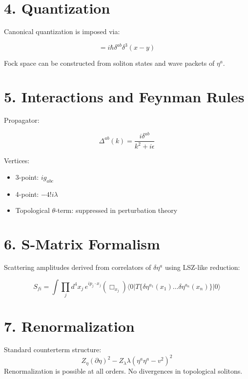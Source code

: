 \documentclass[12pt]{article}
\begin{document}
\section*{4. Quantization}

Canonical quantization is imposed via:

\begin{equation}
[\hat{\eta}^a(x), \hat{\pi}_\eta^b(y)] = i \hbar \delta^{ab} \delta^3(x - y)
\end{equation}

Fock space can be constructed from soliton states and wave packets of $\eta^a$.

\section*{5. Interactions and Feynman Rules}

Propagator:

\begin{equation}
\Delta^{ab}(k) = \frac{i \delta^{ab}}{k^2 + i\epsilon}
\end{equation}

Vertices:
\begin{itemize}
  \item 3-point: $i g_{abc}$
  \item 4-point: $-4! i \lambda$
  \item Topological $\theta$-term: suppressed in perturbation theory
\end{itemize}

\section*{6. S-Matrix Formalism}

Scattering amplitudes derived from correlators of $\delta \eta^a$ using LSZ-like reduction:

\begin{equation}
S_{fi} = \int \prod_j d^4x_j \, e^{i p_j \cdot x_j} (\Box_{x_j}) \langle 0 | T \{ \delta \eta^{a_1}(x_1) \dots \delta \eta^{a_n}(x_n) \} | 0 \rangle
\end{equation}

\section*{7. Renormalization}

Standard counterterm structure:
\[
Z_\eta (\partial \eta)^2 - Z_\lambda \lambda (\eta^a \eta^a - v^2)^2
\]
Renormalization is possible at all orders. No divergences in topological solitons.
\end{document}
